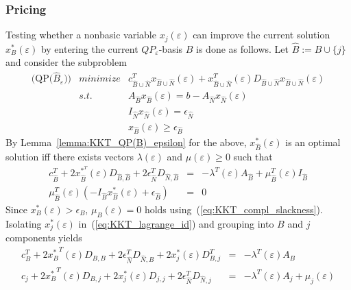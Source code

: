 \documentclass[a4paper]{article}
\newcommand{\xe}[1]{\ensuremath{x_{#1}(\varepsilon)}}
\begin{document}
\subsubsection{Pricing}
Testing whether a nonbasic variable \xe{j} can improve the
current solution $x_{B}^{*}(\varepsilon)$ by entering the current
$QP_{\varepsilon}$-basis $B$ is done as follows.
Let $\hat{B}:=B \cup \{j\}$ and consider the subproblem
\begin{eqnarray*}
  \mbox{(QP($\hat{B}_{\varepsilon}$))} &minimize& c_{\hat{B} \cup \hat{N}}^{T}
    x_{\hat{B} \cup \hat{N}}(\varepsilon) +
    x_{\hat{B} \cup \hat{N}}^{T}(\varepsilon)
    D_{\hat{B} \cup \hat{N}}x_{\hat{B} \cup \hat{N}}(\varepsilon)
      \\
    & s.t. & A_{\hat{B}}x_{\hat{B}}(\varepsilon) = b - A_{\hat{N}}
    x_{\hat{N}}(\varepsilon)  \\
    & & I_{\hat{N}}x_{\hat{N}}(\varepsilon) = \epsilon_{\hat{N}} \\
    & & x_{\hat{B}}(\varepsilon) \geq \epsilon_{\hat{B}}  
\end{eqnarray*}
By Lemma~\ref{lemma:KKT_QP(B)_epsilon} for the above,
$x_{\hat{B}}^{*}(\varepsilon)$ is an optimal solution
iff there exists vectors $\lambda(\varepsilon)$ and
$\mu(\varepsilon) \geq 0$ such that
\begin{eqnarray}
\label{eq:KKT_lagrange_id}
  c_{\hat{B}}^{T} + 2x_{\hat{B}}^{*^{\scriptstyle{T}}}(\varepsilon)D_{\hat{B}, \hat{B}} +
  2\epsilon_{\hat{N}}^{T}D_{\hat{N}, \hat{B}}& = &
  -\lambda^{T}(\varepsilon)A_{\hat{B}} 
  + \mu_{\hat{B}}^{T}(\varepsilon)I_{\hat{B}}  \\
\label{eq:KKT_compl_slackness}
  \mu_{\hat{B}}^{T}(\varepsilon)
  \left(-I_{\hat{B}}x_{\hat{B}}^{*}(\varepsilon)
  + \epsilon_{\hat{B}}\right) & = & 0
\end{eqnarray}
Since $x_{B}^{*}(\varepsilon)> \epsilon_{B}$, $\mu_{B}(\varepsilon)=0$ holds
using~(\ref{eq:KKT_compl_slackness}). Isolating $x_{j}^{*}(\varepsilon)$
in~(\ref{eq:KKT_lagrange_id}) and grouping into $B$ and $j$ components yields
\begin{eqnarray}
\label{eq:KKT_lagrange_id_B}
  c_{B}^{T} + {2x_{B}^{*}}^{T}(\varepsilon)D_{B,B}
  + 2\epsilon_{\hat{N}}^{T}D_{\hat{N},B}
  + 2x_{j}^{*}(\varepsilon)D_{B,j}^{T} & = & -\lambda^{T}(\varepsilon) A_{B} \\
\label{eq:KKT_lagrange_id_j}
  c_{j} + 2{x_{B}^{*}}^{T}(\varepsilon)D_{B,j}
  + 2x_{j}^{*}(\varepsilon)D_{j,j}
  + 2\epsilon_{\hat{N}}^{T}D_{\hat{N},j} & = &
  -\lambda^{T}(\varepsilon) A_{j} + \mu_{j}(\varepsilon)
\end{eqnarray}
\end{document}
